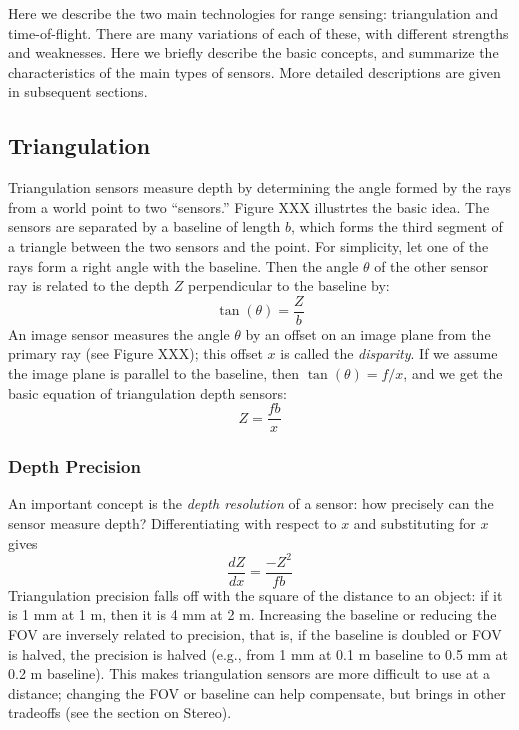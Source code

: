 \documentclass[twocolumn,oneside]{book}
\begin{document}
Here we describe the two main technologies for range sensing:
triangulation and time-of-flight.  There are many variations of each
of these, with different strengths and weaknesses.  Here we briefly
describe the basic concepts, and summarize the characteristics of the
main types of sensors.  More detailed descriptions are given in
subsequent sections.

\subsection{Triangulation}

Triangulation sensors measure depth by determining the angle formed by
the rays from a world point to two ``sensors.''  Figure XXX illustrtes
the basic idea.  The sensors are separated by a baseline of length
$b$, which forms the third segment of a triangle between the two
sensors and the point.  For simplicity, let one of the rays form a
right angle with the baseline.  Then the angle $\theta$ of the other
sensor ray is related to the depth $Z$ perpendicular to the baseline
by:
\begin{equation}
 \tan(\theta) = \frac{Z}{b}
\label{eq31.angle-range}
\end{equation}
An image sensor measures the angle $\theta$ by an offset on an
image plane from the primary ray (see Figure XXX); this offset $x$ is
called the {\em disparity}.  If we assume the image plane is parallel
to the baseline, then $\tan(\theta) = f/x$, and we get the basic
equation of triangulation depth sensors:
\begin{equation}
 Z = \frac{fb}{x}
\label{eq31.disparity}
\end{equation}

\subsubsection{Depth Precision} 

An important concept is the {\em depth resolution} of a sensor: how
precisely can the sensor measure depth?  Differentiating with respect
to $x$ and substituting for $x$ gives 
\begin{equation}
 \frac{dZ}{dx} = \frac{-Z^2}{fb}
\label{eq31.disparity-resolution}
\end{equation}
Triangulation precision falls off with the square of the distance to
an object: if it is 1 mm at 1 m, then it is 4 mm at 2 m.  Increasing
the baseline or reducing the FOV are inversely related to precision,
that is, if the baseline is doubled or FOV is halved, the precision is
halved (e.g., from 1 mm at 0.1 m baseline to 0.5 mm at 0.2 m
baseline).  This makes triangulation sensors are more difficult to use
at a distance; changing the FOV or baseline can help compensate, but
brings in other tradeoffs (see the section on Stereo).
\end{document}
